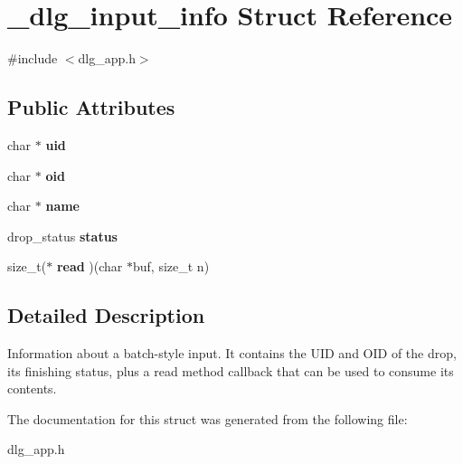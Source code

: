 \hypertarget{struct__dlg__input__info}{}\section{\+\_\+dlg\+\_\+input\+\_\+info Struct Reference}
\label{struct__dlg__input__info}


{\ttfamily \#include $<$dlg\+\_\+app.\+h$>$}

\subsection*{Public Attributes}
\begin{DoxyCompactItemize}
\item 
\mbox{\label{struct__dlg__input__info_addb01f4f9940571280a4a0535362d736}} 
char $\ast$ {\bfseries uid}
\item 
\mbox{\label{struct__dlg__input__info_a0ce992ed132c011f95a7917721fcb06a}} 
char $\ast$ {\bfseries oid}
\item 
\mbox{\label{struct__dlg__input__info_aa0592bc6ac98ca9c6e1644e19e9d98ee}} 
char $\ast$ {\bfseries name}
\item 
\mbox{\label{struct__dlg__input__info_a1ff81da8a8d5ce8f46275438bbc0f561}} 
drop\+\_\+status {\bfseries status}
\item 
\mbox{\label{struct__dlg__input__info_a02c602f0fd50b9e55d52e059fa602d5b}} 
size\+\_\+t($\ast$ {\bfseries read} )(char $\ast$buf, size\+\_\+t n)
\end{DoxyCompactItemize}


\subsection{Detailed Description}
Information about a batch-\/style input. It contains the U\+ID and O\+ID of the drop, its finishing status, plus a read method callback that can be used to consume its contents. 

The documentation for this struct was generated from the following file\+:\begin{DoxyCompactItemize}
\item 
dlg\+\_\+app.\+h\end{DoxyCompactItemize}
